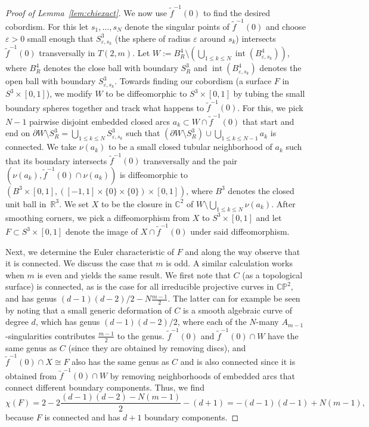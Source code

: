 \documentclass[10pt,a4paper]{article}
\theoremstyle{definition}
\numberwithin{equation}{section}
\DeclareMathOperator{\intt}{int}
\renewcommand*\epsilon{\varepsilon}
\newcommand*\C{\mathbb{C}}
\newcommand*\R{\mathbb{R}}
\renewcommand*\P{\mathbb{P}}
\begin{document}
\begin{proof}[Proof of Lemma~\ref{lem:chiexact}]
We now use $\widetilde{f}^{-1}(0)$ to find the desired cobordism. For this let $s_1,\dots, s_N$ denote the singular points of $\widetilde{f}^{-1}(0)$ and choose $\epsilon>0$ small enough that $S^3_{\epsilon,s_k}$ (the sphere of radius $\epsilon$ around $s_k$) intersects $\widetilde{f}^{-1}(0)$ transversally in $T(2,m)$. Let $W:= B_R^4\setminus(\bigcup_{1\leq k\leq N}\intt(B^4_{\epsilon,s_k}))$, where $B^4_R$ denotes the close ball with boundary $S^3_R$ and $\intt(B^4_{\epsilon,s_k})$ denotes the open ball with boundary $S^3_{\epsilon,s_k}$. Towards finding our cobordism (a surface $F$ in $S^3\times [0,1]$), we modify $W$ to be diffeomorphic to $S^3\times [0,1]$ by tubing the small boundary spheres together and track what happens to $\widetilde{f}^{-1}(0)$. For this, we pick $N-1$ pairwise disjoint embedded closed arcs $a_k\subset W\cap\widetilde{f}^{-1}(0)$ that start and end on $\partial W\setminus S^3_R=\bigcup_{1\leq k\leq N} S^3_{\epsilon,s_k}$ such that $(\partial W\setminus S^3_R)\cup \bigcup_{1\leq k\leq N-1} a_k$ is connected. We take $\nu(a_k)$ to be a small closed tubular neighborhood of $a_k$ such that its boundary intersects $\widetilde{f}^{-1}(0)$ transversally and the pair $(\nu(a_k), \widetilde{f}^{-1}(0)\cap\nu(a_k))$ is diffeomorphic to $(B^3\times[0,1],([-1,1]\times\{0\}\times\{0\})\times[0,1])$, where $B^3$ denotes the closed unit ball in~$\R^3$. We set $X$ to be the closure in $\C^2$ of $W\setminus\bigcup_{1\leq k\leq N} \nu(a_k)$. After smoothing corners, we pick a diffeomorphism from $X$ to $S^3\times [0,1]$ and let $F\subset S^3\times [0,1]$ denote the image of $X\cap\widetilde{f}^{-1}(0)$ under said diffeomorphism.

Next, we determine the Euler characteristic of $F$ and along the way observe that it is connected. We discuss the case that $m$ is odd. A similar calculation works when $m$ is even and yields the same result. We first note that $C$ (as a topological surface) is connected, as is the case for all irreducible projective curves in $\C\P^2$, and has genus $(d-1)(d-2)/2-N\frac{m-1}{2}$. The latter can for example be seen by noting that a small generic deformation of $C$ is a smooth algebraic curve of degree $d$, which has genus $(d-1)(d-2)/2$, where each of the $N$-many $A_{m-1}$-singularities contributes $\frac{m-1}{2}$ to the genus. $\widetilde{f}^{-1}(0)$ and $\widetilde{f}^{-1}(0)\cap W$ have the same genus as $C$ (since they are obtained by removing discs), and $\widetilde{f}^{-1}(0)\cap X\cong F$ also has the same genus as $C$ and is also connected since it is obtained from $\widetilde{f}^{-1}(0)\cap W$ by removing neighborhoods of embedded arcs that connect different boundary components. Thus, we find
\[
\chi(F)=2-2\frac{(d-1)(d-2)-N(m-1)}{2}-(d+1) =-(d-1)(d-1)+N(m-1),
\]
because $F$ is connected and has $d+1$ boundary components.


\end{proof}
\end{document}
